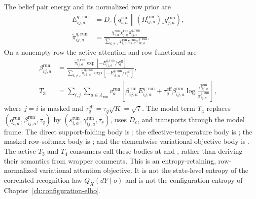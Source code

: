 The belief pair energy and its normalized row prior are
\begin{align}
 E_{ij,a}^{q,\mathrm{run}}
 &=D_\varepsilon\left(q_{i,a}^{\mathrm{run}}\middle\Vert
    (\Omega_{ij,a}^{\mathrm{run}})_{\ast}
    q_{j,a}^{\mathrm{run}}\right),\\
 \widetilde\pi_{ij,a}^{q,\mathrm{run}}
 &=\frac{\chi_{i,a}^{\mathrm{run}}\chi_{j,a}^{\mathrm{run}}
 \pi_{ij,a}^{q,\mathrm{run}}}
 {\sum_{k\ne i}\chi_{i,a}^{\mathrm{run}}\chi_{k,a}^{\mathrm{run}}
 \pi_{ik,a}^{q,\mathrm{run}}}.
\end{align}
On a nonempty row the active attention and row functional are
\begin{align}
 \beta_{ij,a}^{\mathrm{run}}
 &=\frac{\widetilde\pi_{ij,a}^{q,\mathrm{run}}
 \exp[-E_{ij,a}^{q,\mathrm{run}}/\tau_q^{\mathrm{eff}}]}
 {\sum_{k\ne i}\widetilde\pi_{ik,a}^{q,\mathrm{run}}
 \exp[-E_{ik,a}^{q,\mathrm{run}}/\tau_q^{\mathrm{eff}}]},\\
 T_3
 &=\sum_{i,j}\sum_{a\in\Lambda_{\mathrm{run}}}v_a^{\mathrm{run}}
 \left[
 \beta_{ij,a}^{\mathrm{run}}E_{ij,a}^{q,\mathrm{run}}
 +\tau_q^{\mathrm{eff}}\beta_{ij,a}^{\mathrm{run}}
 \log\frac{\beta_{ij,a}^{\mathrm{run}}}
 {\widetilde\pi_{ij,a}^{q,\mathrm{run}}}
 \right],
\end{align}
where $j=i$ is masked and $\tau_q^{\mathrm{eff}}=\tau_q\sqrt K=\sqrt7$. The model term $T_4$ replaces $(q_{i,a}^{\mathrm{run}},\beta_{ij,a}^{\mathrm{run}},\tau_q)$ by $(s_{i,a}^{\mathrm{run}},\gamma_{ij,a}^{\mathrm{run}},\tau_s)$, uses $D_\varepsilon$, and transports through the model frame. The direct support-folding body is ; the effective-temperature body is ; the masked row-softmax body is ; and the elementwise variational objective body is . The active $T_3$ and $T_4$ consumers call these bodies at  and , rather than deriving their semantics from wrapper comments. This is an entropy-retaining, row-normalized variational attention objective. It is not the state-level entropy of the correlated recognition law $Q_X(dY\mid o)$ and is not the configuration entropy of Chapter~\ref{ch:configuration-elbo}.

